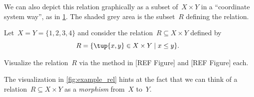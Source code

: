 We can also depict this relation graphically as a subset of~$X \times Y$ in a ``coordinate system way'', as in \cref{fig:example_rel_coord}. The shaded grey area is the subset~$R$ defining the relation. 

\begin{figure}[h!]
\begin{center}
\end{center}
\label{fig:example_rel_coord}
\end{figure}

\begin{exercise}
Let~$X = Y = \{1, 2, 3, 4 \}$ and consider the relation~$R \subseteq X \times Y$ defined by 
\begin{equation}
R = \{ \tup{x,y} \in X \times Y \mid x \leq y \}. 
\end{equation}

Visualize the relation~$R$ via the method in [REF Figure] and [REF Figure] each. 
\end{exercise}

The visualization in \cref{fig:example_rel} hints at the fact that we can think of a relation~$R \subseteq X \times Y$ as a \emph{morphism} from~$X$ to~$Y$.

